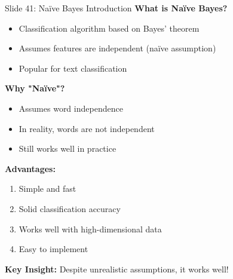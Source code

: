 \documentclass[8pt]{beamer}
\begin{document}
	\begin{frame}{Slide 41: Naïve Bayes Introduction}
		\fontsize{6.5}{7.5}\selectfont
		\textbf{What is Naïve Bayes?}
		\begin{itemize}
			\item Classification algorithm based on Bayes' theorem
			\item Assumes features are independent (naïve assumption)
			\item Popular for text classification
		\end{itemize}
		
		\vspace{0.1cm}
		\textbf{Why "Naïve"?}
		\begin{itemize}
			\item Assumes word independence
			\item In reality, words are not independent
			\item Still works well in practice
		\end{itemize}
		
		\vspace{0.1cm}
		\textbf{Advantages:}
		\begin{enumerate}
			\item Simple and fast
			\item Solid classification accuracy
			\item Works well with high-dimensional data
			\item Easy to implement
		\end{enumerate}
		
		\textcolor{myblue}{\textbf{Key Insight:}} Despite unrealistic assumptions, it works well!
	\end{frame}
	
\end{document}
